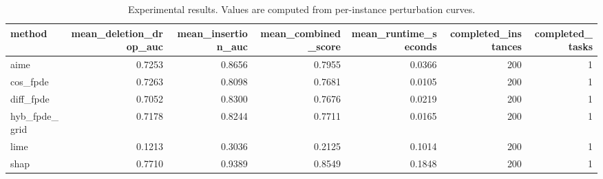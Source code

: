 \begin{table}[t]
\caption{Experimental results. Values are computed from per-instance perturbation curves.}
\label{tab:main_results_computed}
\centering
\begin{tabular}{lrrrrrr}
\toprule
method & mean\_deletion\_drop\_auc & mean\_insertion\_auc & mean\_combined\_score & mean\_runtime\_seconds & completed\_instances & completed\_tasks \\
\midrule
aime & 0.7253 & 0.8656 & 0.7955 & 0.0366 & 200 & 1 \\
cos\_fpde & 0.7263 & 0.8098 & 0.7681 & 0.0105 & 200 & 1 \\
diff\_fpde & 0.7052 & 0.8300 & 0.7676 & 0.0219 & 200 & 1 \\
hyb\_fpde\_grid & 0.7178 & 0.8244 & 0.7711 & 0.0165 & 200 & 1 \\
lime & 0.1213 & 0.3036 & 0.2125 & 0.1014 & 200 & 1 \\
shap & 0.7710 & 0.9389 & 0.8549 & 0.1848 & 200 & 1 \\
\bottomrule
\end{tabular}

\end{table}
